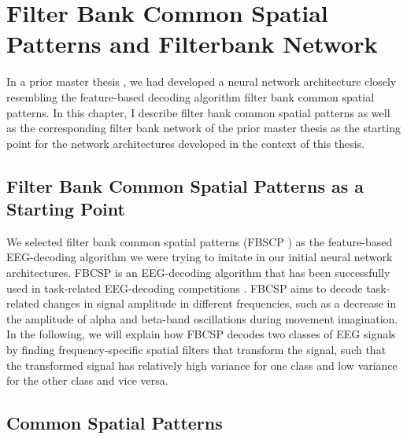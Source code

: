 \chapter{Filter Bank Common Spatial Patterns and
Filterbank Network}\label{ch:fbscp-and-filterbank-net}



    In a prior master thesis
\citep{schirrmeister_msc_thesis_2015}, we had developed a
neural network architecture closely resembling the feature-based
decoding algorithm filter bank common spatial patterns. In this chapter,
I describe filter bank common spatial patterns as well as the
corresponding filter bank network of the prior master thesis as the
starting point for the network architectures developed in the context of
this thesis.

\section{Filter Bank Common Spatial Patterns as a Starting
Point}\label{filter-bank-common-spatial-patterns-as-a-starting-point}


We selected filter bank common spatial patterns (FBSCP
\cite{ang_filter_2008,chin_multi-class_2009}) as the
feature-based EEG-decoding algorithm we were trying to imitate in our
initial neural network architectures. FBCSP is an EEG-decoding algorithm
that has been successfully used in task-related EEG-decoding
competitions \cite{tangermann_review_2012}. FBCSP aims to
decode task-related changes in signal amplitude in different
frequencies, such as a decrease in the amplitude of alpha and beta-band
oscillations during movement imagination. In the following, we will
explain how FBCSP decodes two classes of EEG signals by finding
frequency-specific spatial filters that transform the signal, such that
the transformed signal has relatively high variance for one class and low variance for the
other class and vice versa.


\section{Common Spatial Patterns}\label{common-spatial-patterns}


